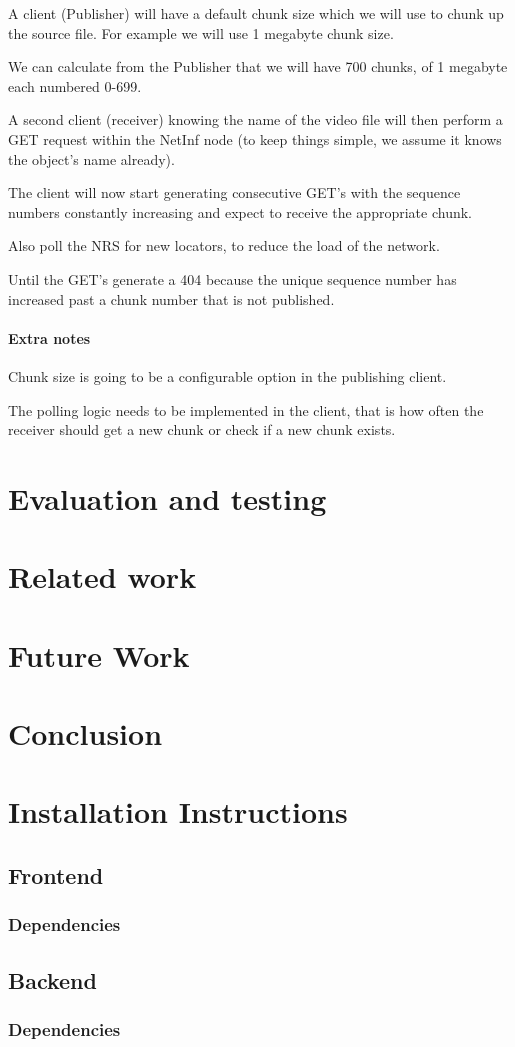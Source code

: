 \documentclass[11pt]{report}
\begin{document}
A client (Publisher) will have a default chunk size which we will use to chunk up the source file. For example we will use 1 megabyte chunk size.

We can calculate from the Publisher that we will have 700 chunks, of 1 megabyte each numbered 0-699. 

A second client (receiver) knowing the name of the video file will then perform a GET request within the NetInf node (to keep things simple, we assume it knows the object's name already).

The client will now start generating consecutive GET's with the sequence numbers constantly increasing and expect to receive the appropriate chunk.

Also poll the NRS for new locators, to reduce the load of the network.

Until the GET's generate a 404 because the unique sequence number has increased past a chunk number that is not published.

\subsubsection{Extra notes}

Chunk size is going to be a configurable option in the publishing client.

The polling logic needs to be implemented in the client, that is how often the receiver should get a new chunk or check if a new chunk exists.  

\chapter{Evaluation and testing}
\chapter{Related work}
\chapter{Future Work}
\chapter{Conclusion}
\chapter{Installation Instructions}
\section {Frontend}
\subsection {Dependencies}
\section {Backend}
\subsection {Dependencies}
\end{document}
